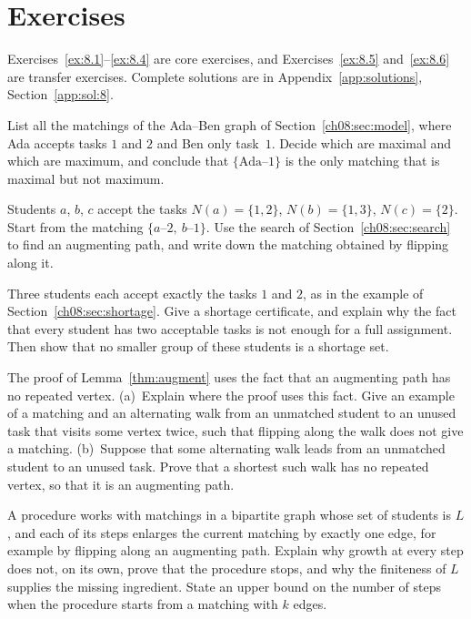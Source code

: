 \section*{Exercises}
Exercises~\ref{ex:8.1}--\ref{ex:8.4} are core exercises, and Exercises~\ref{ex:8.5} and~\ref{ex:8.6} are transfer exercises. Complete solutions are in Appendix~\ref{app:solutions}, Section~\ref{app:sol:8}.
\begin{exercise}\label{ex:8.1}List all the matchings of the Ada--Ben graph of Section~\ref{ch08:sec:model}, where Ada accepts tasks $1$ and $2$ and Ben only task~$1$. Decide which are maximal and which are maximum, and conclude that $\{\text{Ada--}1\}$ is the only matching that is maximal but not maximum.\end{exercise}
\begin{exercise}\label{ex:8.2}Students $a$, $b$, $c$ accept the tasks $N(a)=\{1,2\}$, $N(b)=\{1,3\}$, $N(c)=\{2\}$. Start from the matching $\{a\text{--}2,\ b\text{--}1\}$. Use the search of Section~\ref{ch08:sec:search} to find an augmenting path, and write down the matching obtained by flipping along it.\end{exercise}
\begin{exercise}\label{ex:8.3}Three students each accept exactly the tasks $1$ and $2$, as in the example of Section~\ref{ch08:sec:shortage}. Give a shortage certificate, and explain why the fact that every student has two acceptable tasks is not enough for a full assignment. Then show that no smaller group of these students is a shortage set.\end{exercise}
\begin{exercise}\label{ex:8.4}The proof of Lemma~\ref{thm:augment} uses the fact that an augmenting path has no repeated vertex. (a)~Explain where the proof uses this fact. Give an example of a matching and an alternating walk from an unmatched student to an unused task that visits some vertex twice, such that flipping along the walk does not give a matching. (b)~Suppose that some alternating walk leads from an unmatched student to an unused task. Prove that a shortest such walk has no repeated vertex, so that it is an augmenting path.\end{exercise}
\begin{exercise}\label{ex:8.5}A procedure works with matchings in a bipartite graph whose set of students is $L$, and each of its steps enlarges the current matching by exactly one edge, for example by flipping along an augmenting path. Explain why growth at every step does not, on its own, prove that the procedure stops, and why the finiteness of $L$ supplies the missing ingredient. State an upper bound on the number of steps when the procedure starts from a matching with $k$ edges.\end{exercise}
